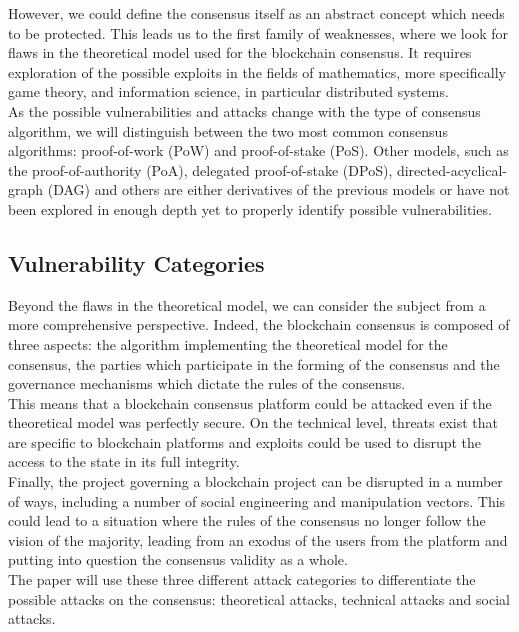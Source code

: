 \documentclass[11pt,a4paper,draft]{article}
\begin{document}
However, we could define the consensus itself as an abstract concept which needs to be protected. This leads us to the first family of weaknesses, where we look for flaws in the theoretical model used for the blockchain consensus. It requires exploration of the possible exploits in the fields of mathematics, more specifically game theory, and information science, in particular distributed systems.\\

As the possible vulnerabilities and attacks change with the type of consensus algorithm, we will distinguish between the two most common consensus algorithms: proof-of-work (PoW) and proof-of-stake (PoS). Other models, such as the proof-of-authority (PoA), delegated proof-of-stake (DPoS), directed-acyclical-graph (DAG) and others are either derivatives of the previous models or have not been explored in enough depth yet to properly identify possible vulnerabilities.\\

\subsection{Vulnerability Categories}

Beyond the flaws in the theoretical model, we can consider the subject from a more comprehensive perspective. Indeed, the blockchain consensus is composed of three aspects: the algorithm implementing the theoretical model for the consensus, the parties which participate in the forming of the consensus and the governance mechanisms which dictate the rules of the consensus.\\

This means that a blockchain consensus platform could be attacked even if the theoretical model was perfectly secure. On the technical level, threats exist that are specific to blockchain platforms and exploits could be used to disrupt the access to the state in its full integrity.\\

Finally, the project governing a blockchain project can be disrupted in a number of ways, including a number of social engineering and manipulation vectors. This could lead to a situation where the rules of the consensus no longer follow the vision of the majority, leading from an exodus of the users from the platform and putting into question the consensus validity as a whole.\\

The paper will use these three different attack categories to differentiate the possible attacks on the consensus: theoretical attacks, technical attacks and social attacks.\\
\end{document}
